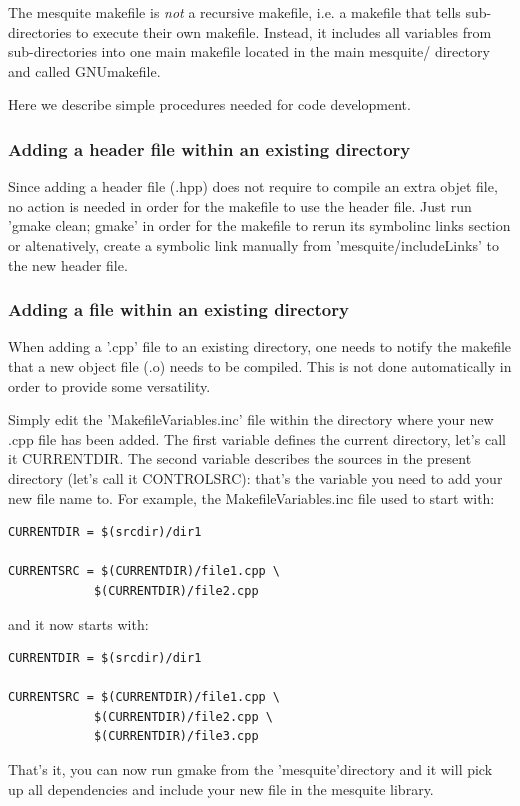 \documentclass[letter]{report}
\begin{document}
The mesquite makefile is \emph{not} a recursive makefile, i.e. a makefile that tells sub-directories
to execute their own makefile. Instead, it includes all variables from sub-directories into one main
makefile located in the main mesquite/ directory and called GNUmakefile.

Here we describe simple procedures needed for code development.

\subsubsection{Adding a header file within an existing directory}

Since adding a header file (.hpp) does not require to compile an extra objet file, no action is
needed in order for the makefile to use the header file. Just run 'gmake clean; gmake' in order for
the makefile to rerun its symbolinc links section or altenatively, create a symbolic link manually from
'mesquite/includeLinks' to the new header file.

\subsubsection{Adding a file within an existing directory}

When adding a '.cpp' file to an existing directory,  one needs to notify the makefile that a new
object file (.o) needs to be compiled. This is not done automatically in order to provide some
versatility.

Simply edit the 'MakefileVariables.inc' file within the directory where your new .cpp file has been added. The first
variable defines the current directory, let's call it CURRENTDIR. The second variable describes the
sources in the present directory (let's call it CONTROLSRC): that's the variable you need to add
your new file name to. For example, the MakefileVariables.inc file used to start with: 
\begin{verbatim}
CURRENTDIR = $(srcdir)/dir1

CURRENTSRC = $(CURRENTDIR)/file1.cpp \
            $(CURRENTDIR)/file2.cpp
\end{verbatim}
and it now starts with:
\begin{verbatim}
CURRENTDIR = $(srcdir)/dir1

CURRENTSRC = $(CURRENTDIR)/file1.cpp \
            $(CURRENTDIR)/file2.cpp \
            $(CURRENTDIR)/file3.cpp
\end{verbatim}
That's it, you can now run gmake from the 'mesquite'directory 
and it will pick up all dependencies and include your new file in
the mesquite library.
\end{document}
